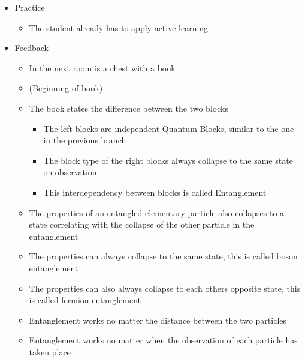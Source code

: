 \documentclass[11pt,twoside]{report} %
\begin{document}
\begin{itemize}
\begin{itemize}
	\end{itemize}
	\item Practice
	\begin{itemize}
		\item The student already has to apply active learning
	\end{itemize}
	\item Feedback
	\begin{itemize}
		\item In the next room is a chest with a book
		\item (Beginning of book)
		\item The book states the difference between the two blocks
		\begin{itemize}
			\item The left blocks are independent Quantum Blocks, similar to the one in the previous branch
			\item The block type of the right blocks always collapse to the same state on observation
			\item This interdependency between blocks is called Entanglement
		\end{itemize}
		\item The properties of an entangled elementary particle also collapses to a state correlating with the collapse of the other particle in the entanglement
		\item The properties can always collapse to the same state, this is called boson entanglement
		\item The properties can also always collapse to each others opposite state, this is called fermion entanglement
		\item Entanglement works no matter the distance between the two particles
		\item Entanglement works no matter when the observation of each particle has taken place
	\end{itemize}
\end{itemize}
\end{document}
